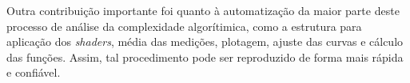 	Outra contribuição importante foi quanto à automatização da maior parte deste processo de análise da complexidade algorítimica, como a estrutura para aplicação dos \textit{shaders}, média das medições, plotagem, ajuste das curvas e cálculo das funções. Assim, tal procedimento pode ser reproduzido de forma mais rápida e confiável. 
